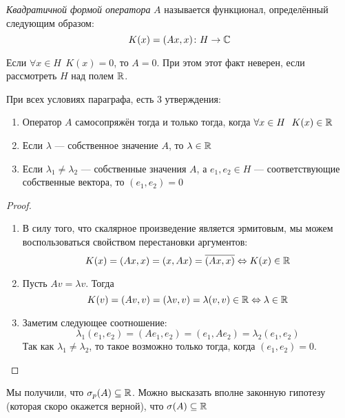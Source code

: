 \begin{definition}
	\textit{Квадратичной формой оператора} $A$ называется функционал, определённый следующим образом:
	\[
		K(x) = (Ax, x) \colon H \to \mathbb{C}
	\]
\end{definition}

\begin{exercise}
	Если $\forall x \in H\ \ K(x) = 0$, то $A = 0$. При этом этот факт неверен, если рассмотреть $H$ над полем $\mathbb{R}$.
\end{exercise}

\begin{theorem}
	При всех условиях параграфа, есть 3 утверждения:
	\begin{enumerate}
		\item Оператор $A$ самосопряжён тогда и только тогда, когда $\forall x \in H\ \ K(x) \in \mathbb{R}$
		
		\item Если $\lambda$ --- собственное значение $A$, то $\lambda \in \mathbb{R}$
		
		\item Если $\lambda_1 \neq \lambda_2$ --- собственные значения $A$, а $e_1, e_2 \in H$ --- соответствующие собственные вектора, то $(e_1, e_2) = 0$
	\end{enumerate}
\end{theorem}

\begin{proof}~
	\begin{enumerate}
		\item В силу того, что скалярное произведение является эрмитовым, мы можем воспользоваться свойством перестановки аргументов:
		\[
			K(x) = (Ax, x) = (x, Ax) = \overline{(Ax, x)} \Leftrightarrow K(x) \in \mathbb{R}
		\]
		
		\item Пусть $Av = \lambda v$. Тогда
		\[
			K(v) = (Av, v) = (\lambda v, v) = \lambda (v, v) \in \mathbb{R} \Leftrightarrow \lambda \in \mathbb{R}
		\]
		
		\item Заметим следующее соотношение:
		\[
			\lambda_1(e_1, e_2) = (Ae_1, e_2) = (e_1, Ae_2) = \lambda_2(e_1, e_2)
		\]
		Так как $\lambda_1 \neq \lambda_2$, то такое возможно только тогда, когда $(e_1, e_2) = 0$.
	\end{enumerate}
\end{proof}

\begin{note}
	Мы получили, что $\sigma_p(A) \subseteq \mathbb{R}$. Можно высказать вполне законную гипотезу (которая скоро окажется верной), что $\sigma(A) \subseteq \mathbb{R}$
\end{note}

